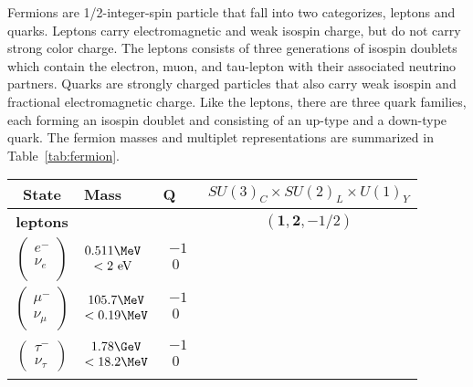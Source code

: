 Fermions are 1/2-integer-spin particle that fall into two categorizes, leptons and quarks.  Leptons carry electromagnetic and weak isospin charge, but do not carry strong color charge.  The leptons consists of three generations of isospin doublets which contain the electron, muon, and tau-lepton with their associated neutrino partners.  Quarks are strongly charged particles that also carry weak isospin and fractional electromagnetic charge.  Like the leptons, there are three quark families, each forming an isospin doublet and consisting of an up-type and a down-type quark.  The fermion masses and multiplet representations are summarized in Table~\ref{tab:fermion}.
\begin{table}[!htb]
\centering
\small
\begin{tabular}{|cllc|}
\hline
State  & Mass & Q & $SU(3)_{C} \times SU(2)_{L} \times U(1)_{Y}$ \\
\hline \hline
\textbf{leptons}&&&$(\mathbf{1}, \mathbf{2}, -1/2)$\\
\hline
$\begin{pmatrix}
e^- \\
\nu_e\\
\end{pmatrix}$
&$\begin{matrix}
0.511\MeV \\
<2~\mathrm{eV}\\
\end{matrix}$
&$\begin{matrix}
-1\\
~0\\
\end{matrix}$&\\
\hline
$\begin{pmatrix} \mu^-\\ \nu_\mu \end{pmatrix}$
 &$\begin{matrix} 105.7\MeV\\  <0.19\MeV \\ \end{matrix}$
  &$\begin{matrix} -1\\  ~0 \\ \end{matrix}$&\\
\hline
$\begin{pmatrix} \tau^- \\ \nu_\tau \end{pmatrix}$
&$\begin{matrix} 1.78\GeV  \\ <18.2\MeV \end{matrix}$
  &$\begin{matrix} -1\\  ~0 \\ \end{matrix}$&\\  
\hline 


\end{tabular}
\end{table}
